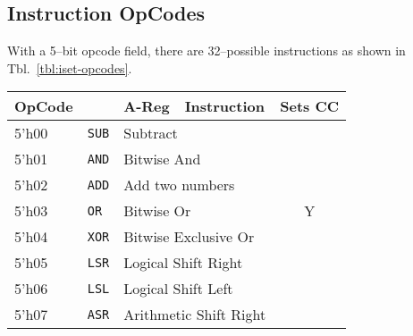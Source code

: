 \documentclass{gqtekspec}
\begin{document}
\subsection{Instruction OpCodes}\label{sec:isa-opcodes}
With a 5--bit opcode field, there are 32--possible instructions as shown in 
Tbl.~\ref{tbl:iset-opcodes}.
\begin{table}\begin{center}
\begin{tabular}{|l|l|l|l|c|} \hline \rowcolor[gray]{0.85}
OpCode & & A-Reg & Instruction &Sets CC \\\hline\hline
5'h00 & {\tt SUB} & \multicolumn{2}{l|}{Subtract} &   \\\cline{1-4}
5'h01 & {\tt AND} & \multicolumn{2}{l|}{Bitwise And} &   \\\cline{1-4}
5'h02 & {\tt ADD} & \multicolumn{2}{l|}{Add two numbers} &   \\\cline{1-4}
5'h03 & {\tt OR}  & \multicolumn{2}{l|}{Bitwise Or} & Y \\\cline{1-4}
5'h04 & {\tt XOR} & \multicolumn{2}{l|}{Bitwise Exclusive Or} &   \\\cline{1-4}
5'h05 & {\tt LSR} & \multicolumn{2}{l|}{Logical Shift Right} &   \\\cline{1-4}
5'h06 & {\tt LSL} & \multicolumn{2}{l|}{Logical Shift Left} &   \\\cline{1-4}
5'h07 & {\tt ASR} & \multicolumn{2}{l|}{Arithmetic Shift Right} &   \\\hline


\end{tabular}
\end{center}
\end{table}
\end{document}

